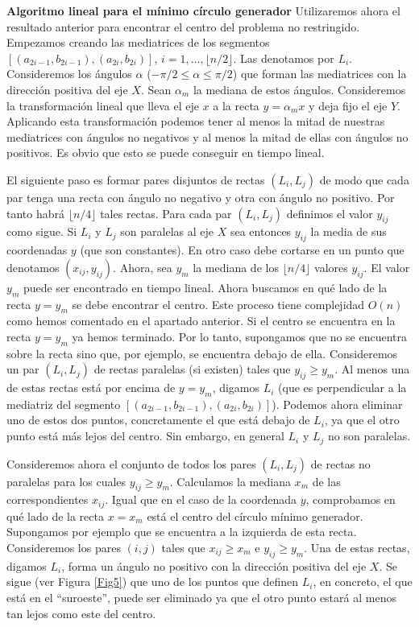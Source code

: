\documentclass[twoside]{article}
\begin{document}
\begin{solucion}
  \textbf{Algoritmo lineal para el mínimo círculo generador} 
  Utilizaremos ahora el resultado anterior para encontrar el centro del problema no restringido. Empezamos creando las mediatrices de los segmentos $[(a_{2i-1},b_{2i-1}),(a_{2i},b_{2i})]$, $i=1,\dots, \lfloor n/2\rfloor$. Las denotamos por $L_i$. Consideremos los ángulos $\alpha$ ($-\pi/2\leq\alpha\leq\pi/2$) que forman las mediatrices con la dirección positiva del eje $X$. Sean $\alpha_m$ la mediana de estos ángulos. Consideremos la transformación lineal que lleva el eje $x$ a la recta $y=\alpha_mx$ y deja fijo el eje $Y$. Aplicando esta transformación podemos tener al menos la mitad de nuestras mediatrices con ángulos no negativos y al menos la mitad de ellas con ángulos no positivos. Es obvio que esto se puede conseguir en tiempo lineal.
  
  El siguiente paso es formar pares disjuntos de rectas $(L_i,L_j)$ de modo que cada par tenga una recta con ángulo no negativo y otra con ángulo no positivo. Por tanto habrá $\lfloor n/4\rfloor$ tales rectas. Para cada par $(L_i,L_j)$ definimos el valor $y_{ij}$ como sigue. Si $L_i$ y $L_j$ son paralelas al eje $X$ sea entonces $y_{ij}$ la media de sus coordenadas $y$ (que son constantes). En otro caso debe cortarse en un punto que denotamos $(x_{ij},y_{ij})$. Ahora, sea $y_m$ la mediana de los $\lfloor n/4\rfloor$ valores $y_{ij}$. El valor $y_m$ puede ser encontrado en tiempo lineal. Ahora buscamos en qué lado de la recta $y=y_m$ se debe encontrar el centro. Este proceso tiene complejidad $O(n)$ como hemos comentado en el apartado anterior. Si el centro se encuentra en la recta $y=y_m$ ya hemos terminado. Por lo tanto, supongamos que no se encuentra sobre la recta sino que, por ejemplo, se encuentra debajo de ella. Consideremos un par $(L_i,L_j)$ de rectas paralelas (si existen) tales que $y_{ij}\geq y_m$. Al menos una de estas rectas está por encima de $y=y_m$, digamos $L_i$ (que es perpendicular a la mediatriz del segmento $[(a_{2i-1},b_{2i-1}),(a_{2i},b_{2i})]$). Podemos ahora eliminar uno de estos dos puntos, concretamente el que está debajo de $L_i$, ya que el otro punto está más lejos del centro. Sin embargo, en general $L_i$ y $L_j$ no son paralelas. 
  
  Consideremos ahora el conjunto de todos los pares $(L_i,L_j)$ de rectas no paralelas para los cuales $y_{ij}\geq y_m$. Calculamos la mediana $x_m$ de las  correspondientes $x_{ij}$. Igual que en el caso de la coordenada $y$, comprobamos en qué lado de la recta $x=x_m$ está el centro del círculo mínimo generador. Supongamos por ejemplo que se encuentra a la izquierda de esta recta. Consideremos los pares $(i,j)$ tales que $x_{ij}\geq x_m$ e $y_{ij}\geq y_m$. Una de estas rectas, digamos $L_i$, forma un ángulo no positivo con la dirección positiva del eje $X$. Se sigue (ver Figura \ref{Fig5}) que uno de los puntos que definen $L_i$, en concreto, el que está en el ``suroeste'', puede ser eliminado ya que el otro punto estará al menos tan lejos como este del centro.
  

\end{solucion}
\end{document}
